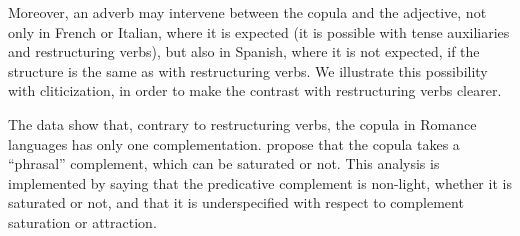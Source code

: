 {\begin{exe}
\begin{xlist}
    \label{GSexemple33b} 
		
	\label{GSexemple33c} 
	\end{xlist}
\end{exe}

Moreover, an adverb may intervene between the copula and the adjective, not only in French or Italian, where it is expected (it is possible with tense auxiliaries and restructuring verbs), but also in Spanish, where it is not expected, if the structure is the same as with restructuring verbs. We illustrate this possibility with cliticization, in order to make the contrast with restructuring verbs clearer.

\eal
	\label{GSexemple34} 
	\label{GSexemple34a}

	\label{GSexemple34b}
		
	\label{GSexemple34c}
\zl

The data show that, contrary to restructuring verbs, the copula in Romance languages has only one complementation. \citet{AG2002b-u,AG2010} propose that the copula takes a ``phrasal'' complement, which can be saturated or not. This analysis is implemented by saying that the predicative complement is non-light, whether it is saturated or not, and that it is underspecified with respect to complement saturation or attraction.

}
